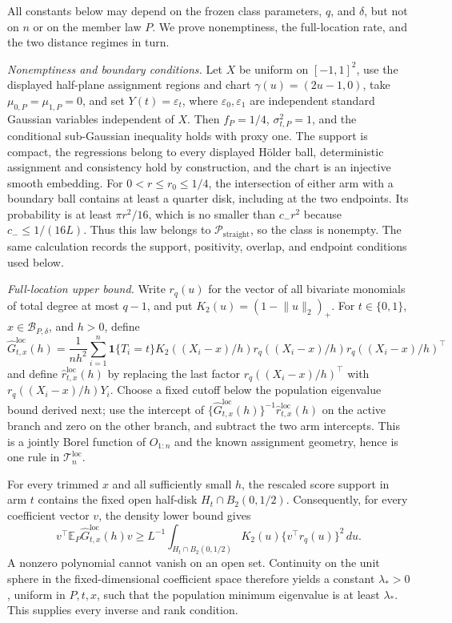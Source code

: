 All constants below may depend on the frozen class parameters, \(q\), and \(\delta\), but not on \(n\) or on the member law \(P\).  We prove nonemptiness, the full-location rate, and the two distance regimes in turn.

\emph{Nonemptiness and boundary conditions.}
Let \(X\) be uniform on \([-1,1]^2\), use the displayed half-plane assignment regions and chart \(\gamma(u)=(2u-1,0)\), take \(\mu_{0,P}=\mu_{1,P}=0\), and set \(Y(t)=\varepsilon_t\), where \(\varepsilon_0,\varepsilon_1\) are independent standard Gaussian variables independent of \(X\).  Then \(f_P=1/4\), \(\sigma^2_{t,P}=1\), and the conditional sub-Gaussian inequality holds with proxy one.  The support is compact, the regressions belong to every displayed H\"older ball, deterministic assignment and consistency hold by construction, and the chart is an injective smooth embedding.  For \(0<r\leq r_0\leq1/4\), the intersection of either arm with a boundary ball contains at least a quarter disk, including at the two endpoints.  Its probability is at least \(\pi r^2/16\), which is no smaller than \(c_-r^2\) because \(c_-\leq1/(16L)\).  Thus this law belongs to \(\mathcal P_{\mathrm{straight}}\), so the class is nonempty.  The same calculation records the support, positivity, overlap, and endpoint conditions used below.

\emph{Full-location upper bound.}
Write \(r_q(u)\) for the vector of all bivariate monomials of total degree at most \(q-1\), and put \(K_2(u)=(1-\lVert u\rVert_2)_+\).  For \(t\in\{0,1\}\), \(x\in\mathcal B_{P,\delta}\), and \(h>0\), define
\[
 \widehat G^{\mathrm{loc}}_{t,x}(h)
 =\frac1{nh^2}\sum_{i=1}^n
 \mathbf 1\{T_i=t\}K_2((X_i-x)/h)
 r_q((X_i-x)/h)r_q((X_i-x)/h)^\top
\]
and define \(\widehat r^{\mathrm{loc}}_{t,x}(h)\) by replacing the last factor \(r_q((X_i-x)/h)^\top\) with \(r_q((X_i-x)/h)Y_i\).  Choose a fixed cutoff below the population eigenvalue bound derived next; use the intercept of \(\{\widehat G^{\mathrm{loc}}_{t,x}(h)\}^{-1}\widehat r^{\mathrm{loc}}_{t,x}(h)\) on the active branch and zero on the other branch, and subtract the two arm intercepts.  This is a jointly Borel function of \(O_{1:n}\) and the known assignment geometry, hence is one rule in \(\mathcal T_n^{\mathrm{loc}}\).

For every trimmed \(x\) and all sufficiently small \(h\), the rescaled score support in arm \(t\) contains the fixed open half-disk \(H_t\cap B_2(0,1/2)\).  Consequently, for every coefficient vector \(v\), the density lower bound gives
\[
 v^\top\mathbb E_P\widehat G^{\mathrm{loc}}_{t,x}(h)v
 \geq L^{-1}\int_{H_t\cap B_2(0,1/2)}
 K_2(u)\{v^\top r_q(u)\}^2\,du.
\]
A nonzero polynomial cannot vanish on an open set.  Continuity on the unit sphere in the fixed-dimensional coefficient space therefore yields a constant \(\lambda_*>0\), uniform in \(P,t,x\), such that the population minimum eigenvalue is at least \(\lambda_*\).  This supplies every inverse and rank condition.

